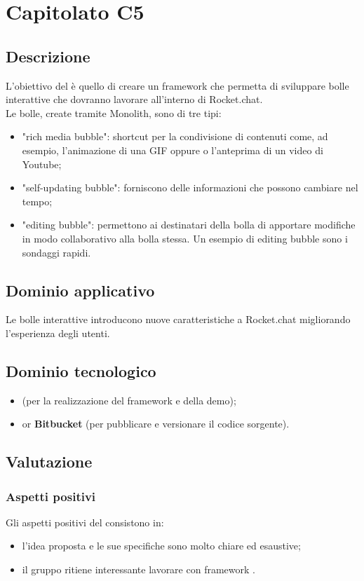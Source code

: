 \section {Capitolato C5}
	\subsection {Descrizione}
		L'obiettivo del  è quello di creare un framework che permetta di sviluppare bolle interattive che dovranno lavorare all'interno di Rocket.chat. \\
		Le bolle, create tramite Monolith, sono di tre tipi:
		\begin{itemize}
			\item "rich media bubble": shortcut per la condivisione di contenuti come, ad esempio, l'animazione di una GIF oppure o l'anteprima di un video di Youtube;
			\item "self-updating bubble": forniscono delle informazioni che possono cambiare nel tempo;
			\item "editing bubble": permettono ai destinatari della bolla di apportare modifiche in modo collaborativo alla bolla stessa. Un esempio di editing bubble sono i sondaggi rapidi.
		\end{itemize}
	\subsection {Dominio applicativo}
		Le bolle interattive introducono nuove caratteristiche a Rocket.chat migliorando l'esperienza degli utenti.
	\subsection {Dominio tecnologico}
		\begin{itemize}
		\item \textbf{} (per la realizzazione del framework e della demo);
		\item \textbf{} or \textbf{Bitbucket} (per pubblicare e versionare il codice sorgente).
		\end{itemize}
	\subsection {Valutazione}
		\subsubsection {Aspetti positivi}
		Gli aspetti positivi del  consistono in:
			\begin{itemize}
				\item l’idea proposta e le sue specifiche sono molto chiare ed esaustive;
				\item il gruppo ritiene interessante lavorare con framework .
			\end{itemize}
